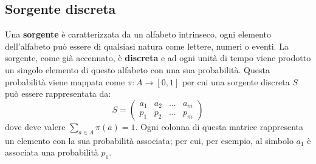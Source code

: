 \documentclass{article}
\theoremstyle{definition}
\numberwithin{equation}{section}
\begin{document}
\subsection{Sorgente discreta}
Una \textbf{sorgente} è caratterizzata da un alfabeto intrinseco, ogni elemento dell'alfabeto può essere di qualsiasi natura come lettere, numeri o eventi. La sorgente, come già accennato, è \textbf{discreta} e ad ogni unità di tempo viene prodotto un singolo elemento di questo alfabeto con una sua probabilità. Questa probabilità viene mappata come  $\pi:A\xrightarrow{}[0,1]$ per cui una sorgente discreta $S$ può essere rappresentata da:
\begin{equation}\label{eq:discrete_source}S=
    \begin{pmatrix}
        a_1 & a_2 & ... & a_m \\
        p_1 & p_2 & ... & p_m
    \end{pmatrix}
\end{equation}
dove deve valere $\sum_{a\in A}\pi(a)=1$. Ogni colonna di questa matrice rappresenta un elemento con la sua probabilità associata; per cui, per esempio, al simbolo $a_1$ è associata una probabilità $p_1$.
\end{document}
